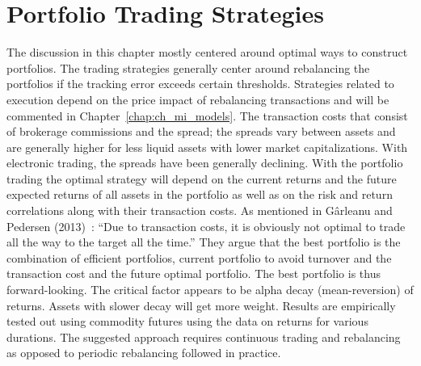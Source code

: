 \section{Portfolio Trading Strategies \label{sec:port_trad_strat}}


The discussion in this chapter mostly centered around optimal ways to construct portfolios. The trading strategies generally center around rebalancing the portfolios if the tracking error exceeds certain thresholds. Strategies related to execution depend on the price impact of rebalancing transactions and will be commented in Chapter~\ref{chap:ch_mi_models}. The transaction costs that consist of brokerage commissions and the spread; the spreads vary between assets and are generally higher for less liquid assets with lower market capitalizations. With electronic trading, the spreads have been generally declining. With the portfolio trading the optimal strategy will depend on the current returns and the future expected returns of all assets in the portfolio as well as on the risk and return correlations along with their transaction costs. As mentioned in G\^{a}rleanu and Pedersen (2013)~\cite{garlepede}: ``Due to transaction costs, it is obviously not optimal to trade all the way to the target all the time.'' They argue that the best portfolio is the combination of efficient portfolios, current portfolio to avoid turnover and the transaction cost and the future optimal portfolio. The best portfolio is thus forward-looking. The critical factor appears to be alpha decay (mean-reversion) of returns. Assets with slower decay will get more weight. Results are empirically tested out using commodity futures using the data on returns for various durations. The suggested approach requires continuous trading and rebalancing as opposed to periodic rebalancing followed in practice. 



